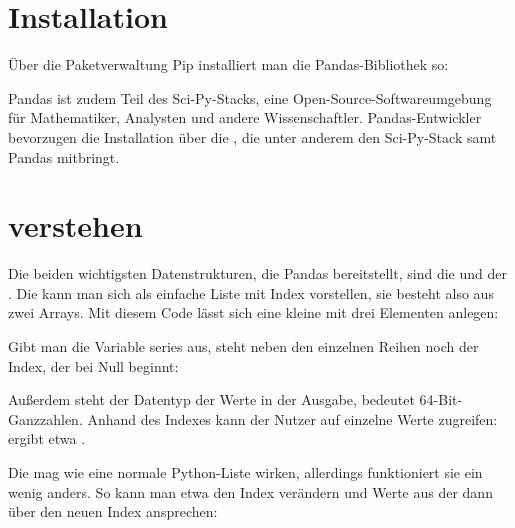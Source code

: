 \section{Installation}

Über die Paketverwaltung Pip installiert man die Pandas-Bibliothek so:

\medskip
	

\medskip

Pandas ist zudem Teil des Sci-Py-Stacks, eine Open-Source-Softwareumgebung für Mathematiker, Analysten und andere Wissenschaftler. Pandas-Entwickler bevorzugen die Installation über die , die unter anderem den Sci-Py-Stack samt Pandas mitbringt.

\section{ verstehen}

Die beiden wichtigsten Datenstrukturen, die Pandas bereitstellt, sind die  und der . Die  kann man sich als einfache Liste mit Index vorstellen, sie besteht also aus zwei Arrays. Mit diesem Code lässt sich eine kleine  mit drei Elementen anlegen:

\medskip


\medskip


Gibt man die Variable series aus, steht neben den einzelnen Reihen noch der Index, der bei Null beginnt:


\medskip





\medskip

Außerdem steht der Datentyp der Werte in der Ausgabe,  bedeutet 64-Bit-Ganzzahlen. Anhand des Indexes kann der Nutzer auf einzelne Werte zugreifen:  ergibt etwa .

Die  mag wie eine normale Python-Liste wirken, allerdings funktioniert sie ein wenig anders. So kann man etwa den Index verändern und Werte aus der  dann über den neuen Index ansprechen:

\medskip

